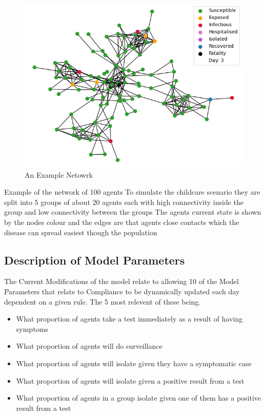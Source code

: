 \documentclass{article}
\begin{document}
\begin{figure}
  \centering
      \includegraphics[width=\textwidth]{network}
  \caption{An Example Netowrk}
\end{figure}

Example of the network of 100 agents
To simulate the childcare scenario they are split into 5 groups of about 20 agents each with high connectivity inside the group and low connectivity between the groups 
The agents current state is shown by the nodes colour and the edges are that agents close contacts which the disease can spread easiest though the population


\subsection{Description of Model Parameters}
The Current Modifications of the model relate to allowing 10 of the Model Parameters that relate to Compliance to be dynamically updated each day dependent on a given rule. The 5 most relevent of these being.
\begin{itemize}
\item What proportion of agents take a test immediately as a result of having symptoms
\item What proportion of agents will do surveillance
\item What proportion of agents will isolate given they have a symptomatic case
\item What proportion of agents will isolate given a positive result from a test
\item What proportion of agents in a group isolate given one of them has a positive result from a test
\end{itemize}
\end{document}

